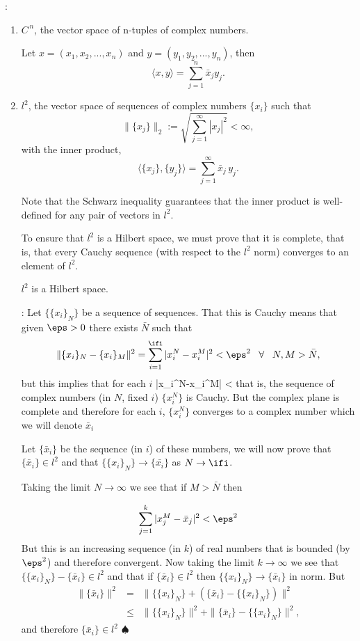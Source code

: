 \noi {}:

\begin{enumerate}
\item $C^{\,n}$, the vector space of n-tuples of complex numbers.

Let $x = (x_1,x_2,...,x_n)$ and $y = (y_1,y_2,...,y_n)$, then 
$$\langle x,y\rangle = \sum^n_{j=1} \bar x_j y_j . $$

\item $l^2$, the vector space of sequences of complex numbers
$\{x_i\}$ such that 
$$\|\{x_j\}\|_2 := \sqrt{\sum^{\infty}_{j=1} |x_j|^2 } < \infty, $$
with the inner product,
$$ \langle\{x_j\},\{y_j\}\rangle = \sum^{\infty}_{j=1} \bar x_j\, y_j .$$

Note that the Schwarz inequality guarantees that the inner product is well-defined for any pair of vectors in $l^2$.

To ensure that $l^2$ is a Hilbert space, we must prove that it is complete, that is, that every Cauchy sequence (with respect to the $l^2$ norm) converges to an element of $l^2$.

\blem 
$l^2$ is a Hilbert space.
\elem

\pru:
Let $\{\{x_i\}_N\}$ be a sequence of sequences. That this is Cauchy means that given $\eps > 0$ there exists $\bar N$ such that
\[
\|\{x_i\}_N- \{x_i\}_M\|^2 = \sum_{i=1}^{\ifi}|x_i^N-x_i^M|^2 < \eps^2
\;\;\; \forall \;\;\; N,M > \bar{N},
\]
%
but this implies that for each $i$
\beq
|x_i^N-x_i^M| < \eps
\eeq
that is, the sequence of complex numbers (in $N$, fixed $i$) $\{x_i^N\}$ is Cauchy. But the complex plane is complete and therefore for each $i$, $\{x_i^N\} $ converges to a complex number which we will denote $\bar x_i$

Let $\{\bar x_i\}$ be the sequence (in $i$) of these numbers, we will now prove that $\{\bar x_i\} \in l^2$ and that 
 $\{\{x_i\}_N\}\longrightarrow\{\bar {x_i}\}$ as $N\to\ifi$.
 
Taking the limit $N \to \infty$ we see that if $M > \bar{N}$ then

$$ 
\sum_{j=1}^k |x^M_j - \bar{x}_j|^2 < \eps^2 
$$
%
But this is an increasing sequence (in $k$) of real numbers that is bounded (by $\eps^2$) and therefore convergent.
Now taking the limit $k \to \infty$ we see that 
$\{\{x_i\}_N\} - \{\bar x_i\} \in l^2$ and that if $\{\bar x_i\} \in l^2$ then $\{\{x_i\}_N\} \to \{\bar x_i\}$ in norm.
%
But 
\begin{eqnarray*}
\|\{\bar x_i\}\|^2 &=& 
\| \{\{x_i\}_N\} + (\{\bar x_i\} - \{\{x_i\}_N\} )\|^2 \\
&\leq& \|\{\{x_i\}_N\}\|^2 + \|\{\bar x_i\} - \{\{x_i\}_N\}\|^2,
\end{eqnarray*}
and therefore $\{\bar x_i\} \in l^2$ $\spadesuit$


\end{enumerate}
